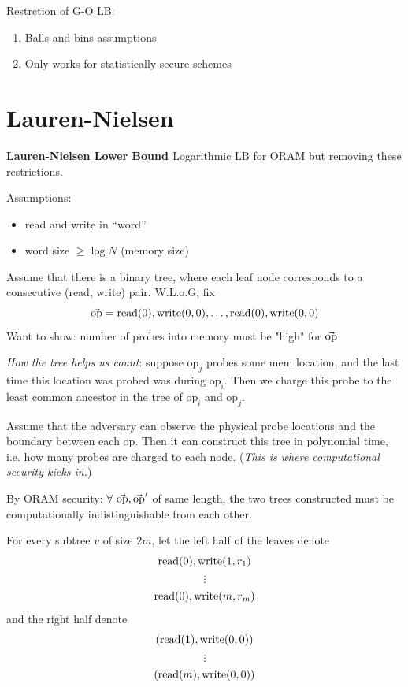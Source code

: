 {{\noindent Restrction of G-O LB:
\begin{enumerate}
  \item Balls and bins assumptions
  \item Only works for statistically secure schemes
\end{enumerate}
}

\section{Lauren-Nielsen}

\textbf{Lauren-Nielsen Lower Bound \cite{larsen18lowerbound}} Logarithmic LB for ORAM but removing these restrictions.

\noindent Assumptions:
\begin{itemize}
  \item read and write in ``word''
  \item word size $\geq \log N$ (memory size)
\end{itemize}

Assume that there is a binary tree, where each leaf node corresponds to a consecutive (read, write) pair. W.L.o.G, fix 
$$\vec{\mbox{op}} = \mbox{read}(0), \mbox{write}(0, 0), \dots, \mbox{read}(0), \mbox{write}(0, 0)$$
Want to show: number of probes into memory must be "high" for $\vec{\mbox{op}}$.

\noindent \emph{How the tree helps us count}: suppose $\mbox{op}_j$ probes some mem location, and the last time this location was probed was during $\mbox{op}_i$. Then we charge this probe to the least common ancestor in the tree of $\mbox{op}_i$ and $\mbox{op}_j$.


Assume that the adversary can observe the physical probe locations and the boundary between each $\mbox{op}$. Then it can construct this tree in polynomial time, i.e. how many probes are charged to each node. (\emph{This is where computational security kicks in.})

By ORAM security: $\forall\ \vec{\mbox{op}}, \vec{\mbox{op}}'$ of same length, the two trees constructed must be computationally indistinguishable from each other.

For every subtree $v$ of size $2m$, let the left half of the leaves denote
$$\mbox{read}(0), \mbox{write}(1, r_1)$$
$$\vdots$$
$$\mbox{read}(0), \mbox{write}(m, r_m)$$
and the right half denote
$$(\mbox{read}(1), \mbox{write}(0, 0))$$
$$\vdots$$
$$(\mbox{read}(m), \mbox{write}(0, 0))$$

}
